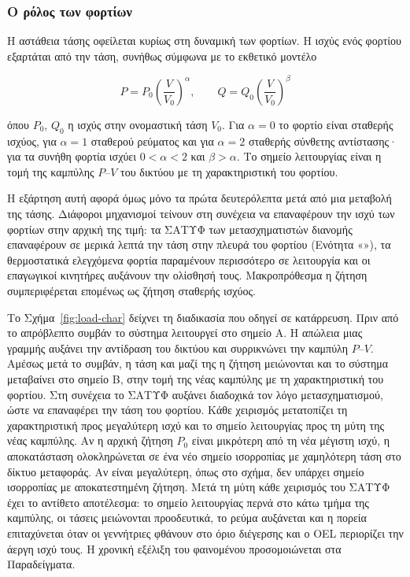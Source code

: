 \subsubsection{Ο ρόλος των φορτίων}
\label{sec:load-role}

Η αστάθεια τάσης οφείλεται κυρίως στη δυναμική των φορτίων. Η ισχύς ενός φορτίου εξαρτάται
από την τάση, συνήθως σύμφωνα με το εκθετικό μοντέλο

\begin{equation}
P = P_0 \left(\frac{V}{V_0}\right)^{\alpha}, \qquad
Q = Q_0 \left(\frac{V}{V_0}\right)^{\beta}
\label{eq:loadexp}
\end{equation}

όπου $P_0$, $Q_0$ η ισχύς στην ονομαστική τάση $V_0$. Για $\alpha = 0$ το φορτίο είναι σταθερής
ισχύος, για $\alpha = 1$ σταθερού ρεύματος και για $\alpha = 2$ σταθερής σύνθετης αντίστασης·
για τα συνήθη φορτία ισχύει $0 < \alpha < 2$ και $\beta > \alpha$. Το σημείο λειτουργίας είναι
η τομή της καμπύλης $P$--$V$ του δικτύου με τη χαρακτηριστική του φορτίου.

Η εξάρτηση αυτή αφορά όμως μόνο τα πρώτα δευτερόλεπτα μετά από μια μεταβολή της τάσης.
Διάφοροι μηχανισμοί τείνουν στη συνέχεια να επαναφέρουν την ισχύ των φορτίων στην αρχική της
τιμή: τα ΣΑΤΥΦ των μετασχηματιστών διανομής επαναφέρουν σε μερικά λεπτά την τάση
στην πλευρά του φορτίου (Ενότητα «»), τα θερμοστατικά ελεγχόμενα φορτία
παραμένουν περισσότερο σε λειτουργία και οι επαγωγικοί κινητήρες αυξάνουν την ολίσθησή τους.
Μακροπρόθεσμα η ζήτηση συμπεριφέρεται επομένως ως ζήτηση σταθερής ισχύος.

Το Σχήμα~\ref{fig:load-char} δείχνει τη διαδικασία που οδηγεί σε κατάρρευση. Πριν από το
απρόβλεπτο συμβάν το σύστημα λειτουργεί στο σημείο A. Η απώλεια μιας γραμμής αυξάνει την
αντίδραση του δικτύου και συρρικνώνει την καμπύλη $P$--$V$. Αμέσως μετά το συμβάν, η τάση και
μαζί της η ζήτηση μειώνονται και το σύστημα μεταβαίνει στο σημείο B, στην τομή της νέας καμπύλης
με τη χαρακτηριστική του φορτίου. Στη συνέχεια το ΣΑΤΥΦ αυξάνει διαδοχικά τον λόγο
μετασχηματισμού, ώστε να επαναφέρει την τάση του φορτίου. Κάθε χειρισμός μετατοπίζει τη
χαρακτηριστική προς μεγαλύτερη ισχύ και το σημείο λειτουργίας προς τη μύτη της νέας καμπύλης.
Αν η αρχική ζήτηση $P_0$ είναι μικρότερη από τη νέα μέγιστη ισχύ, η αποκατάσταση ολοκληρώνεται
σε ένα νέο σημείο ισορροπίας με χαμηλότερη τάση στο δίκτυο μεταφοράς. Αν είναι μεγαλύτερη,
όπως στο σχήμα, δεν υπάρχει σημείο ισορροπίας με αποκατεστημένη ζήτηση. Μετά τη μύτη κάθε
χειρισμός του ΣΑΤΥΦ έχει το αντίθετο αποτέλεσμα: το σημείο λειτουργίας περνά στο κάτω τμήμα
της καμπύλης, οι τάσεις μειώνονται προοδευτικά, το ρεύμα αυξάνεται και η πορεία επιταχύνεται
όταν οι γεννήτριες φθάνουν στο όριο διέγερσης και ο OEL περιορίζει την άεργη ισχύ τους. Η
χρονική εξέλιξη του φαινομένου προσομοιώνεται στα Παραδείγματα.

